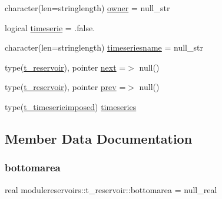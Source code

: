 \begin{DoxyCompactItemize}
character(len=stringlength) \mbox{\hyperlink{structmodulereservoirs_1_1t__reservoir_ac511a63a43ab44c41ff9df7986adef69}{owner}} = null\+\_\+str
\item 
logical \mbox{\hyperlink{structmodulereservoirs_1_1t__reservoir_aab25e0995e74093b54e90b44c6a5f801}{timeserie}} = .false.
\item 
character(len=stringlength) \mbox{\hyperlink{structmodulereservoirs_1_1t__reservoir_a3adf9d2134c4af50ade4f58b1b82c651}{timeseriesname}} = null\+\_\+str
\item 
type(\mbox{\hyperlink{structmodulereservoirs_1_1t__reservoir}{t\+\_\+reservoir}}), pointer \mbox{\hyperlink{structmodulereservoirs_1_1t__reservoir_ab392d0f9158ac20ad9bd1b29a2f2a31c}{next}} =$>$ null()
\item 
type(\mbox{\hyperlink{structmodulereservoirs_1_1t__reservoir}{t\+\_\+reservoir}}), pointer \mbox{\hyperlink{structmodulereservoirs_1_1t__reservoir_a325c1a253a42d37dd413f8a265df6c78}{prev}} =$>$ null()
\item 
type(\mbox{\hyperlink{structmodulereservoirs_1_1t__timeserieimposed}{t\+\_\+timeserieimposed}}) \mbox{\hyperlink{structmodulereservoirs_1_1t__reservoir_a866e1ba1ef11cb9fff383330a17476a7}{timeseries}}
\end{DoxyCompactItemize}


\subsection{Member Data Documentation}
\mbox{\label{structmodulereservoirs_1_1t__reservoir_a8617108d0b03a6d1637ff526752ea07b}} 
\subsubsection{\texorpdfstring{bottomarea}{bottomarea}}
{\footnotesize\ttfamily real modulereservoirs\+::t\+\_\+reservoir\+::bottomarea = null\+\_\+real\hspace{0.3cm}{\ttfamily [private]}}

\mbox{\label{structmodulereservoirs_1_1t__reservoir_a1f646046122b844f8d120be445ea5cbf}} 
